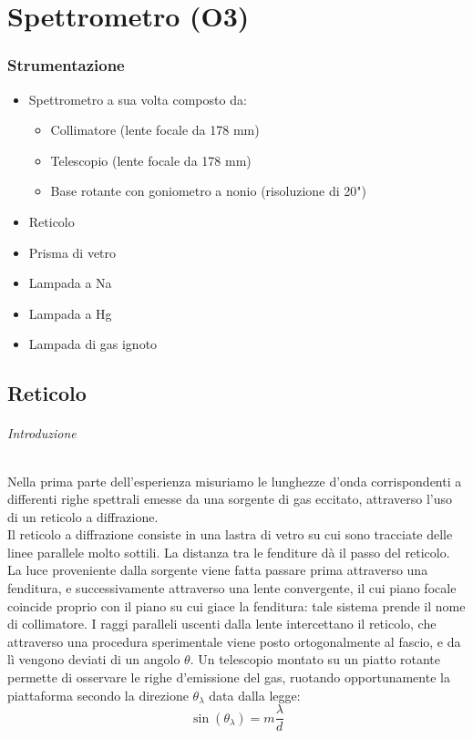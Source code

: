 \chapter{Spettrometro (O3)}

\subsection*{Strumentazione}
\begin{itemize}
 \item Spettrometro
 a sua volta composto da:
 \begin{itemize}
  \item Collimatore (lente focale da 178 mm)
  \item Telescopio (lente focale da 178 mm)
  \item Base rotante con goniometro a nonio (risoluzione di 20") 
 \end{itemize}
  \item Reticolo
  \item Prisma di vetro
  \item Lampada a Na
  \item Lampada a Hg
  \item Lampada di gas ignoto
\end{itemize}



\section*{Reticolo}

\subparagraph{Introduzione}

Nella prima parte dell'esperienza misuriamo le lunghezze d'onda corrispondenti a differenti righe spettrali emesse da una sorgente di gas eccitato, attraverso l'uso di un reticolo a diffrazione. \\
Il reticolo a diffrazione consiste in una lastra di vetro su cui sono tracciate delle linee parallele molto sottili. La distanza tra le fenditure dà il passo del reticolo.\\
La luce proveniente dalla sorgente viene fatta passare prima attraverso una fenditura, e successivamente attraverso una lente convergente, il cui piano focale coincide proprio con il piano su cui giace la fenditura: tale sistema prende il nome di collimatore. I raggi paralleli uscenti dalla lente intercettano il reticolo, che attraverso una procedura sperimentale viene posto ortogonalmente al fascio, e da lì vengono deviati di un angolo $\theta$. Un telescopio montato su un piatto rotante permette di osservare le righe d'emissione del gas, ruotando opportunamente la piattaforma secondo la direzione $\theta_{\lambda} $ data dalla legge:
\begin{equation}
\sin (\theta_{\lambda} )= m \frac{\lambda}{d}
\label{eq:theta}
\end{equation}


